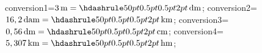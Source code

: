 \documentclass[exercice]{thedocument}%
\begin{document}
%
\>conversion1=$3\,\text{m}=\doted{50pt}\,\text{dm}$;%
\>conversion2=$16,2\,\text{dam}=\doted{50pt}\,\text{km}$;%
\>conversion3=$0,56\,\text{dm}=\doted{50pt}\,\text{cm}$;%
\>conversion4=$5,307\,\text{km}=\doted{50pt}\,\text{hm}$;%
%
\end{document}
